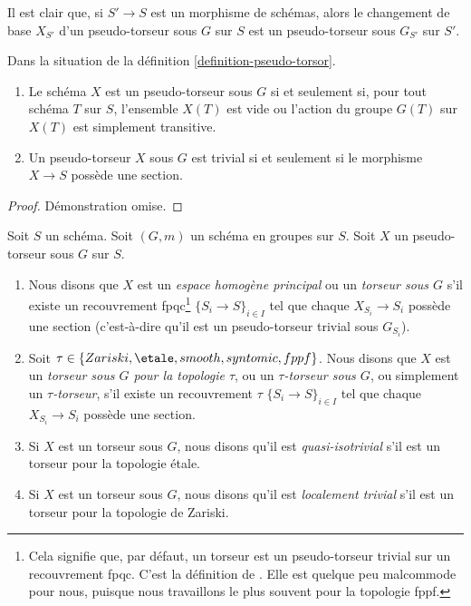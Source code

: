 \noindent
Il est clair que, si $S' \to S$ est un morphisme de schémas, alors
le changement de base $X_{S'}$ d'un pseudo-torseur sous $G$ sur $S$ est un
pseudo-torseur sous $G_{S'}$ sur $S'$.

\begin{lemma}
\label{lemma-characterize-trivial-pseudo-torsors}
Dans la situation de la
définition \ref{definition-pseudo-torsor}.
\begin{enumerate}
\item Le schéma $X$ est un pseudo-torseur sous $G$ si et seulement si, pour tout schéma
$T$ sur $S$, l'ensemble $X(T)$ est vide ou l'action du groupe $G(T)$
sur $X(T)$ est simplement transitive.
\item Un pseudo-torseur $X$ sous $G$ est trivial si et seulement si le morphisme
$X \to S$ possède une section.
\end{enumerate}
\end{lemma}

\begin{proof}
Démonstration omise.
\end{proof}

\begin{definition}
\label{definition-principal-homogeneous-space}
Soit $S$ un schéma.
Soit $(G, m)$ un schéma en groupes sur $S$.
Soit $X$ un pseudo-torseur sous $G$ sur $S$.
\begin{enumerate}
\item Nous disons que $X$ est un {\it espace homogène principal}
ou un {\it torseur sous $G$} s'il existe un recouvrement fpqc\footnote{Cela signifie
que, par défaut, un torseur est un pseudo-torseur trivial sur un
recouvrement fpqc. C'est la définition de \cite[Expos\'e IV, 6.5]{SGA3}.
Elle est quelque peu malcommode pour nous, puisque nous travaillons le plus souvent pour la
topologie fppf.}
$\{S_i \to S\}_{i \in I}$ tel que chaque
$X_{S_i} \to S_i$ possède une section (c'est-à-dire qu'il est un pseudo-torseur trivial sous $G_{S_i}$).
\item Soit $\tau \in\allowbreak \{Zariski,\allowbreak \etale,\allowbreak smooth,\allowbreak syntomic,\allowbreak fppf\}$.
Nous disons que $X$ est un {\it torseur sous $G$ pour la topologie $\tau$}, ou un
{\it $\tau$-torseur sous $G$}, ou simplement un {\it $\tau$-torseur},
s'il existe un recouvrement $\tau$ $\{S_i \to S\}_{i \in I}$
tel que chaque $X_{S_i} \to S_i$ possède une section.
\item Si $X$ est un torseur sous $G$, nous disons qu'il est
{\it quasi-isotrivial} s'il est un torseur pour la topologie \'etale.
\item Si $X$ est un torseur sous $G$, nous disons qu'il est
{\it localement trivial} s'il est un torseur pour la topologie de Zariski.
\end{enumerate}
\end{definition}

